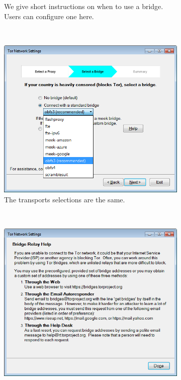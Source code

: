 \documentclass[USenglish,oneside,twocolumn]{article}
\begin{document}
\begin{figure}
\begin{subfigure}[b]{0.30\textwidth}
	\caption{We give short instructions on when to use a bridge. Users can configure one here.}
	\label{fig:new-bridge}
\end{subfigure}
~~~~~~~~~~
\begin{subfigure}[b]{0.30\textwidth}
	\includegraphics[width=\textwidth]{screenshots/NEW-bridgeSettings-combobox.png}
	\caption{The transports selections are the same.}
	\label{fig:new-bridge-combobox}
\end{subfigure}
~~~~~~~~~~
\begin{subfigure}[b]{0.30\textwidth}
	\includegraphics[width=\textwidth]{screenshots/NEW-bridgeHelp.png}

\end{subfigure}
\end{figure}
\end{document}
